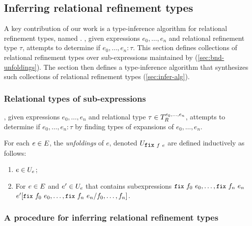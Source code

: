 \subsection{Inferring relational refinement types}
\label{sec:infer}
%
A key contribution of our work is a type-inference algorithm for
relational refinement types, named \sys.
%
\sys, given expressions $e_0, \ldots, e_n$ and relational refinement
type $\tau$, attempts to determine if $e_0, \ldots, e_n : \tau$.
%
This section defines collections of relational refinement types over
sub-expressions maintained by \sys (\autoref{sec:bnd-unfoldings}).
%
The section then defines a type-inference algorithm that synthesizes
such collections of relational refinement types
(\autoref{sec:infer-alg}).

\subsubsection{Relational types of sub-expressions}
\label{sec:bnd-unfoldings}
%
\sys, given expressions $e_0, \ldots, e_n$ and relational type
$\tau \in T_{R}^{e_0, \ldots, e_n}$, attempts to determine if
$e_0, \ldots, e_n : \tau$ by finding types of expansions of
$e_0, \ldots, e_n$.
%
\begin{defn}
  \label{defn:unfoldings}
  For each $e \in E$, the \emph{unfoldings} of $e$, denoted
  $\unfoldings{ \fix{f}{e} }$ are defined inductively as follows:
  \begin{enumerate}
  \item %
    $e \in U_{ e }$;
  \item %
    For $e \in E$ and $e' \in U_{e}$ that contains
    subexpressions $\fix{f_0}{e_0}, \ldots, \fix{f_n}{e_n}$
    $\replace{e'}{f_0, \ldots, f_n}{ \fix{f_0}{e_0}, \ldots,
      \fix{f_n}{e_n} }$.
  \end{enumerate}
\end{defn}
%

\subsubsection{A procedure for inferring relational refinement types}
\label{sec:infer-alg}

